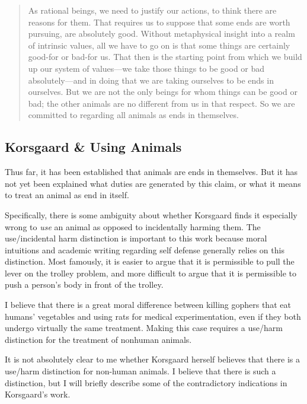 	\begin{quote} As rational beings, we need to justify our actions, to think
		there are reasons for them. That requires us to suppose that some ends
		are worth pursuing, are absolutely good. Without metaphysical insight
		into a realm of intrinsic values, all we have to go on is that some
		things are certainly good-for or bad-for us. That then is the starting
		point from which we build up our system of values—we take those things
		to be good or bad absolutely—and in doing that we are taking ourselves
		to be ends in ourselves.  But we are not the only beings for whom
		things can be good or bad; the other animals are no different from us
		in that respect. So we are committed to regarding all animals as ends
		in themselves.\autocite[8.5.5]{korsgaard_fellow_creatures} \end{quote}

	\subsection{Korsgaard \& Using Animals}

		Thus far, it has been established that animals are ends in themselves.
		But it has not yet been explained what duties are generated by this
		claim, or what it means to treat an animal as end in itself.

		Specifically, there is some ambiguity about whether Korsgaard finds it
		especially wrong to \emph{use} an animal as opposed to incidentally
		harming them.  The use/incidental harm distinction is important to this
		work because moral intuitions and academic writing regarding self
		defense generally relies on this distinction.  Most famously, it is
		easier to argue that it is permissible to pull the lever on the trolley
		problem, and more difficult to argue that it is permissible to push a
		person’s body in front of the trolley.

		I believe that there is a great moral difference between killing
		gophers that eat humans’ vegetables and using rats for medical
		experimentation, even if they both undergo virtually the same
		treatment. Making this case requires a use/harm distinction for the
		treatment of nonhuman animals.

		It is not absolutely clear to me whether Korsgaard herself believes
		that there is a use/harm distinction for non-human animals. I believe
		that there is such a distinction, but I will briefly describe some of
		the contradictory indications in Korsgaard’s work.


